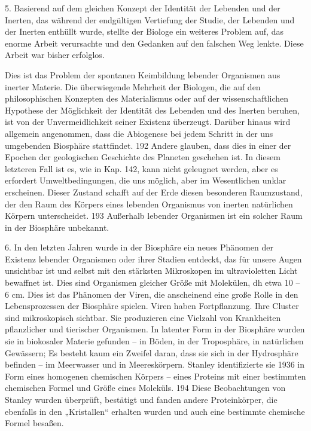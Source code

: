 \documentclass[11pt,a4paper]{book}
\begin{document}
5. Basierend auf dem gleichen Konzept der Identität der Lebenden und der Inerten, das während der endgültigen Vertiefung der Studie, der Lebenden und der Inerten enthüllt wurde, stellte der Biologe ein weiteres Problem auf, das enorme Arbeit verursachte und den Gedanken auf den falschen Weg lenkte. Diese Arbeit war bisher erfolglos.



Dies ist das Problem der spontanen Keimbildung lebender Organismen aus inerter Materie. Die überwiegende Mehrheit der Biologen, die auf den philosophischen Konzepten des Materialismus oder auf der wissenschaftlichen Hypothese der Möglichkeit der Identität des Lebenden und des Inerten beruhen, ist von der Unvermeidlichkeit seiner Existenz überzeugt. Darüber hinaus wird allgemein angenommen, dass die Abiogenese bei jedem Schritt in der uns umgebenden Biosphäre stattfindet. 192 Andere glauben, dass dies in einer der Epochen der geologischen Geschichte des Planeten geschehen ist. In diesem letzteren Fall ist es, wie in Kap. 142, kann nicht geleugnet werden, aber es erfordert Umweltbedingungen, die uns möglich, aber im Wesentlichen unklar erscheinen. Dieser Zustand schafft auf der Erde diesen besonderen Raumzustand, der den Raum des Körpers eines lebenden Organismus von inerten natürlichen Körpern unterscheidet. 193 Außerhalb lebender Organismen ist ein solcher Raum in der Biosphäre unbekannt.



6. In den letzten Jahren wurde in der Biosphäre ein neues Phänomen der Existenz lebender Organismen oder ihrer Stadien entdeckt, das für unsere Augen unsichtbar ist und selbst mit den stärksten Mikroskopen im ultravioletten Licht bewaffnet ist. Dies sind Organismen gleicher Größe mit Molekülen, dh etwa 10 -- 6 cm. Dies ist das Phänomen der Viren, die anscheinend eine große Rolle in den Lebensprozessen der Biosphäre spielen. Viren haben Fortpflanzung. Ihre Cluster sind mikroskopisch sichtbar. Sie produzieren eine Vielzahl von Krankheiten pflanzlicher und tierischer Organismen. In latenter Form in der Biosphäre wurden sie in biokosaler Materie gefunden -- in Böden, in der Troposphäre, in natürlichen Gewässern; Es besteht kaum ein Zweifel daran, dass sie sich in der Hydrosphäre befinden -- im Meerwasser und in Meereskörpern. Stanley identifizierte sie 1936 in Form eines homogenen chemischen Körpers -- eines Proteins mit einer bestimmten chemischen Formel und Größe eines Moleküls. 194 Diese Beobachtungen von Stanley wurden überprüft, bestätigt und fanden andere Proteinkörper, die ebenfalls in den „Kristallen“ erhalten wurden und auch eine bestimmte chemische Formel besaßen.
\end{document}
